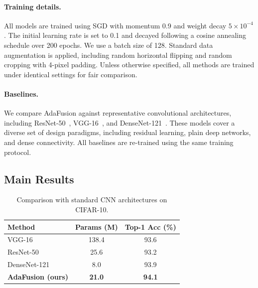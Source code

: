 \documentclass[11pt]{article}
\begin{document}
\paragraph{Training details.}
All models are trained using SGD with momentum 0.9 and weight decay
$5\times10^{-4}$. The initial learning rate is set to 0.1 and decayed following
a cosine annealing schedule over 200 epochs. We use a batch size of 128.
Standard data augmentation is applied, including random horizontal flipping and
random cropping with 4-pixel padding. Unless otherwise specified, all methods
are trained under identical settings for fair comparison.


\paragraph{Baselines.}
We compare AdaFusion against representative convolutional architectures,
including ResNet-50~\cite{he2016resnet}, VGG-16~\cite{simonyan2014vgg}, and
DenseNet-121~\cite{huang2017densenet}. These models cover a diverse set of
design paradigms, including residual learning, plain deep networks, and dense
connectivity. All baselines are re-trained using the same training protocol.

\subsection{Main Results}

\begin{table}[h]
\centering
\caption{Comparison with standard CNN architectures on CIFAR-10.}
\begin{tabular}{lcc}
\toprule
Method & Params (M) & Top-1 Acc (\%) \\
\midrule
VGG-16~\cite{simonyan2014vgg}       & 138.4 & 93.6 \\
ResNet-50~\cite{he2016resnet}       &  25.6 & 93.2 \\
DenseNet-121~\cite{huang2017densenet} & 8.0  & 93.9 \\
\midrule
\textbf{AdaFusion (ours)}           & \textbf{21.0} & \textbf{94.1} \\
\bottomrule
\end{tabular}
\end{table}
\end{document}
